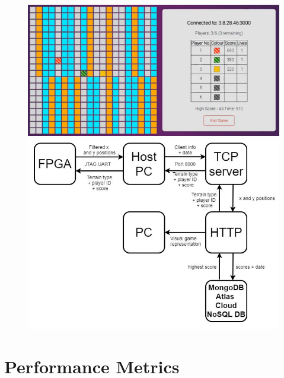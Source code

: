 \documentclass[12pt,a4paper]{article}
\begin{document}
\begin{figure} [h!]
    \includegraphics[scale = 0.4]{Website.png}
    \includegraphics[scale = 0.4]{Arch.png}
\end{figure}
\par

\section{\small Performance Metrics}
\end{document}
